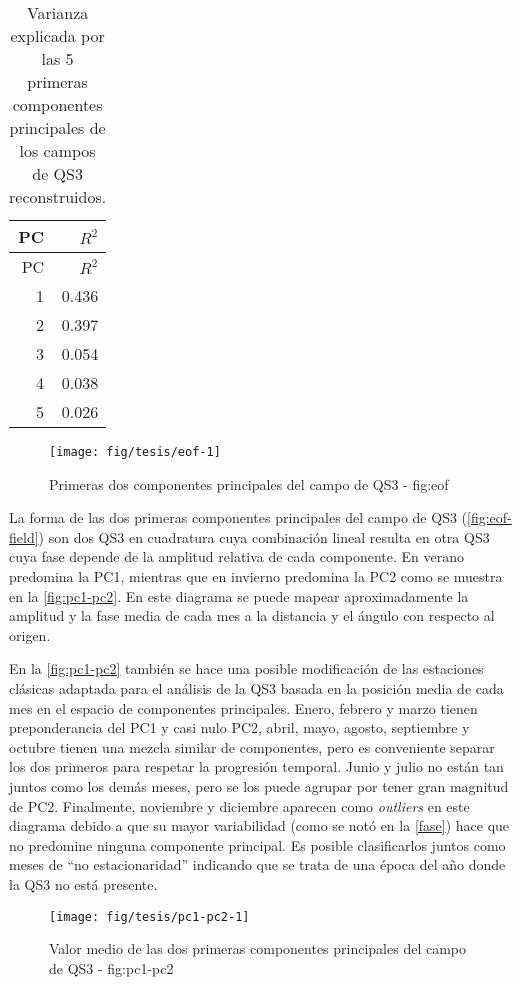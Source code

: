 \documentclass[spanish,a4paper]{book}
\begin{document}
\begin{longtable}[]{@{}rr@{}}
\caption{Varianza explicada por las 5 primeras componentes principales
de los campos de QS3 reconstruidos.}\tabularnewline
\toprule
PC & \(R^2\)\tabularnewline
\midrule
\endfirsthead
\toprule
PC & \(R^2\)\tabularnewline
\midrule
\endhead
1 & 0.436\tabularnewline
2 & 0.397\tabularnewline
3 & 0.054\tabularnewline
4 & 0.038\tabularnewline
5 & 0.026\tabularnewline
\bottomrule
\end{longtable}

\begin{figure}
\texttt{[image: fig/tesis/eof-1]} \caption{Primeras dos componentes principales del campo de QS3 - fig:eof}\label{fig:eof}
\end{figure}

La forma de las dos primeras componentes principales del campo de QS3
(\autoref{fig:eof-field}) son dos QS3 en cuadratura cuya combinación
lineal resulta en otra QS3 cuya fase depende de la amplitud relativa de
cada componente. En verano predomina la PC1, mientras que en invierno
predomina la PC2 como se muestra en la \autoref{fig:pc1-pc2}. En este
diagrama se puede mapear aproximadamente la amplitud y la fase media de
cada mes a la distancia y el ángulo con respecto al origen.

En la \autoref{fig:pc1-pc2} también se hace una posible modificación de
las estaciones clásicas adaptada para el análisis de la QS3 basada en la
posición media de cada mes en el espacio de componentes principales.
Enero, febrero y marzo tienen preponderancia del PC1 y casi nulo PC2,
abril, mayo, agosto, septiembre y octubre tienen una mezcla similar de
componentes, pero es conveniente separar los dos primeros para respetar
la progresión temporal. Junio y julio no están tan juntos como los demás
meses, pero se los puede agrupar por tener gran magnitud de PC2.
Finalmente, noviembre y diciembre aparecen como \emph{outliers} en este
diagrama debido a que su mayor variabilidad (como se notó en la
\autoref{fase}) hace que no predomine ninguna componente principal. Es
posible clasificarlos juntos como meses de ``no estacionaridad''
indicando que se trata de una época del año donde la QS3 no está
presente.

\begin{figure}
\texttt{[image: fig/tesis/pc1-pc2-1]} \caption{Valor medio de las dos primeras componentes principales del campo de QS3 - fig:pc1-pc2}\label{fig:pc1-pc2}
\end{figure}
\end{document}
